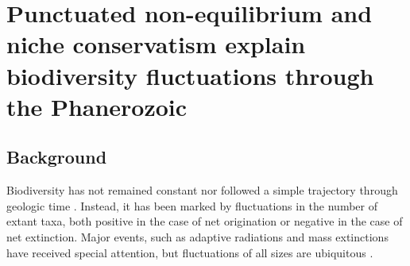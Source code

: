 \chapter{Punctuated non-equilibrium and niche conservatism explain
  biodiversity fluctuations through the Phanerozoic}

\author{Andrew J. Rominger, Miguel A. Fuentes \and Pablo A. Marquet}



\section{Background}
Biodiversity has not remained constant nor followed a simple
trajectory through geologic time \cite{raup1982, sepkoski1984,
  gilinsky1994, liow2007, alroy08, alroy2010}.  Instead, it has been
marked by fluctuations in the number of extant taxa, both positive in
the case of net origination or negative in the case of net
extinction. Major events, such as adaptive radiations and mass
extinctions have received special attention\cite{benton1995,
  Erwin1998}, but fluctuations of all sizes are ubiquitous
\cite{sepkoski1984, alroy08, quental2013}.

